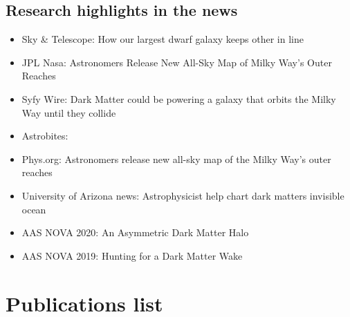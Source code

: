 \documentclass[UTF8]{article}
\begin{document}
\subsection*{Research highlights in the news}
\begin{itemize}
  \setlength\itemsep{0.0em}
  \renewcommand\labelitemi{$\cdot$}
  \item Sky \& Telescope: How our largest dwarf galaxy keeps other in line
  \item JPL Nasa: Astronomers Release New All-Sky Map of Milky Way’s Outer Reaches
  \item Syfy Wire: Dark Matter could be powering a galaxy that orbits the Milky Way until they collide
  \item Astrobites: 
  \item Phys.org: Astronomers release new all-sky map of the Milky Way's outer reaches
 \item University of Arizona news: Astrophysicist help chart dark matters invisible ocean
 \item AAS NOVA 2020: An Asymmetric Dark Matter Halo
 \item AAS NOVA 2019: Hunting for a Dark Matter Wake

\end{itemize}


\section*{Publications list}
\end{document}
